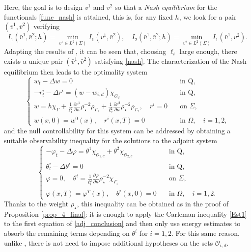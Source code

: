 \documentclass{aims}
\theoremstyle{definition}
\def\cbd{\Gamma}
\begin{document}
\begin{enumerate}
Here, the goal is to design $v^1$ and $v^2$ so that a \textit{Nash equilibrium} for the functionals \eqref{func_nash} is attained, this is,  for any fixed $h$, we look for a pair $(\bar v^1,\bar v^2)$ verifying  
%
\begin{equation}\label{nash}
I_1(\bar v^1,\bar v^2;h)=\min_{v^1\in L^2(\Sigma)}I_1(v^1,\bar v^2), \quad I_2(\bar v^1,\bar v^2;h)=\min_{v^2\in L^2(\Sigma)}I_1(\bar v^1, v^2).
\end{equation}
%
Adapting the results of \cite{araruna,vhs_corri}, it can be seen that, choosing $\ell_i$ large enough, there exists a unique pair $(\bar v^1,\bar v^2)$ satisfying \eqref{nash}. The characterization of the Nash equilibrium then leads to the optimality system
%
\begin{equation*}%
\begin{cases}
w_t-\Delta w=0 &\quad  \text{in Q}, \\
-r^{i}_t-\Delta r^{i}= (w-w_{i,d})\chi_{\mathcal O_d}  &\quad  \text{in Q},\\ 
w=h\chi_{\cbd}+ \frac{1}{\ell_1^2}\frac{\partial r^{1}}{\partial n}\rho_\star^{-2}\rho_{\Gamma_1}+\frac{1}{\ell_2^2}\frac{\partial r^{2}}{\partial n}\rho_\star^{-2}\rho_{ \Gamma_2}, \quad r^{i}=0 &\quad \text{on } \Sigma, \\
w(x,0)=w^0(x),\quad r^{i}(x,T)=0 &\quad \text{in } \Omega, \quad i=1,2,
\end{cases}
\end{equation*}
%
and the null controllability for this system can be addressed by obtaining a suitable observability inequality for the solutions to the adjoint system
%
\begin{equation}\label{adj_conclusion}
\begin{cases}
-\varphi_t-\Delta \varphi=\theta^1\chi_{\mathcal O_{2,d}}+\theta^2\chi_{\mathcal O_{2,d}} &\quad  \text{in Q}, \\
\theta^{i}_t-\Delta \theta^{i}= 0 &\quad  \text{in Q},\\ 
\varphi=0, \quad \theta^{i}=\frac{1}{\ell_i^2}\frac{\partial \varphi}{\partial n}\rho_\star^{-2}\chi_{\Gamma_i} &\quad \text{on } \Sigma, \\
\varphi(x,T)=\varphi^T(x),\quad \theta^{i}(x,0)=0 &\quad \text{in } \Omega, \quad i=1,2.
\end{cases}
\end{equation}
%
Thanks to the weight $\rho_\star$, this inequality can be obtained as in the proof of Proposition \ref{prop_4_final}: it is enough to apply the Carleman inequality \eqref{Est1} to the first equation of \eqref{adj_conclusion} and then only use energy estimates to absorb the remaining terms depending on $\theta^{i}$ for $i=1,2$. For this same reason, unlike \cite{araruna,vhs_corri}, there is not need to impose additional hypotheses on the sets $\mathcal O_{i,d}$.


\end{enumerate}
\end{document}

